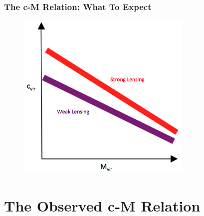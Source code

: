 \documentclass[hyperref={pdfpagelabels=false}]{beamer}
\begin{document}
\begin{frame}
\frametitle{The c-M Relation: What To Expect}
\begin{figure}
\centering
\includegraphics[width=0.75\textwidth]{cM_expect.png}
\end{figure}
\end{frame}



\section{The Observed c-M Relation} 
\end{document}
